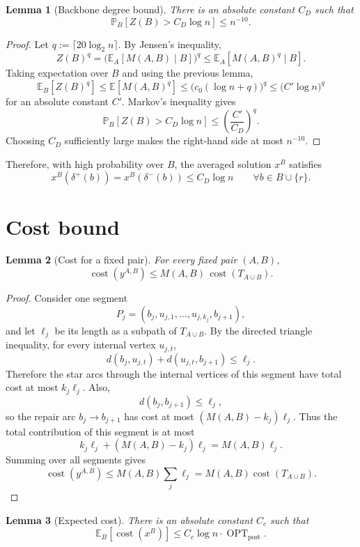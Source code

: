 \documentclass[11pt]{article}
\newtheorem{lemma}{Lemma}
\DeclareMathOperator{\OPT}{OPT}
\newcommand{\E}{\mathbb{E}}
\newcommand{\Prb}{\mathbb{P}}
\newcommand{\1}{\mathbf{1}}
\newcommand{\cost}{\operatorname{cost}}
\begin{document}
\begin{lemma}[Backbone degree bound]
There is an absolute constant $C_D$ such that
\[
  \Prb_B[Z(B)>C_D\log n]\le n^{-10}.
\]
\end{lemma}

\begin{proof}
Let $q:=\lceil 20\log_2 n\rceil$.  By Jensen's inequality,
\[
  Z(B)^q
  =\bigl(\E_A[M(A,B)\mid B]\bigr)^q
  \le \E_A[M(A,B)^q\mid B].
\]
Taking expectation over $B$ and using the previous lemma,
\[
  \E_B[Z(B)^q]
  \le \E[M(A,B)^q]
  \le \bigl(c_0(\log n+q)\bigr)^q
  \le \bigl(C'\log n\bigr)^q
\]
for an absolute constant $C'$.  Markov's inequality gives
\[
  \Prb_B[Z(B)>C_D\log n]
  \le \left(\frac{C'}{C_D}\right)^q.
\]
Choosing $C_D$ sufficiently large makes the right-hand side at most
$n^{-10}$.
\end{proof}

Therefore, with high probability over $B$, the averaged solution $x^B$ satisfies
\[
  x^B(\delta^+(b))=x^B(\delta^-(b))\le C_D\log n
  \qquad \forall b\in B\cup\{r\}.
\]

\section{Cost bound}

\begin{lemma}[Cost for a fixed pair]
For every fixed pair $(A,B)$,
\[
  \cost(y^{A,B})\le M(A,B)\,\cost(T_{A\cup B}).
\]
\end{lemma}

\begin{proof}
Consider one segment
\[
  P_j=(b_j,u_{j,1},\ldots,u_{j,k_j},b_{j+1}),
\]
and let $\ell_j$ be its length as a subpath of $T_{A\cup B}$.  By the directed
triangle inequality, for every internal vertex $u_{j,t}$,
\[
  d(b_j,u_{j,t})+d(u_{j,t},b_{j+1})\le \ell_j.
\]
Therefore the star arcs through the internal vertices of this segment have total
cost at most $k_j\ell_j$.  Also,
\[
  d(b_j,b_{j+1})\le \ell_j,
\]
so the repair arc $b_j\to b_{j+1}$ has cost at most
$(M(A,B)-k_j)\ell_j$.  Thus the total contribution of this segment is at most
\[
  k_j\ell_j+(M(A,B)-k_j)\ell_j=M(A,B)\ell_j.
\]
Summing over all segments gives
\[
  \cost(y^{A,B})\le M(A,B)\sum_j\ell_j=M(A,B)\cost(T_{A\cup B}).
\]
\end{proof}

\begin{lemma}[Expected cost]
There is an absolute constant $C_c$ such that
\[
  \E_B[\cost(x^B)]\le C_c\log n\cdot \OPT_{\mathrm{post}}.
\]
\end{lemma}
\end{document}
